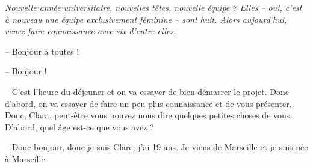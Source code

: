 \documentclass[11pt, french]{report}
\begin{document}
\textit{Nouvelle année universitaire, nouvelles têtes, nouvelle équipe ?  Elles -- oui, c'est à nouveau une
  équipe exclusivement féminine -- sont huit.  Alors aujourd'hui, venez faire connaissance avec six d'entre elles.}

\vfill

-- Bonjour à toutes !

-- Bonjour !

-- C'est l'heure du déjeuner et on va essayer de bien démarrer le projet. Donc d'abord, on va essayer de faire un
peu plus connaissance et de vous présenter. Donc, Clara, peut-être vous pouvez nous dire quelques petites choses
de vous. D'abord, quel âge est-ce que vous avez ?

-- Donc bonjour, donc je suis Clare, j'ai 19 ans. Je viens de Marseille et je suis née à Marseille.
\end{document}

